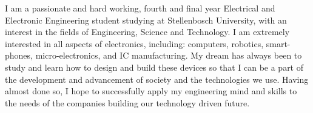 

I am a passionate and hard working, fourth and final year Electrical and Electronic Engineering student studying at Stellenbosch University, with an interest in the fields of Engineering, Science and Technology.  
I am extremely interested in all aspects of electronics, including: computers,  robotics, smart-phones, micro-electronics, and IC manufacturing.  
My dream has always been to study and learn how to design and build these devices so that I can be a part of the development and advancement of society and the technologies we use. Having almost done so, I hope to successfully apply my engineering mind and skills to the needs of the companies building our technology driven future.

